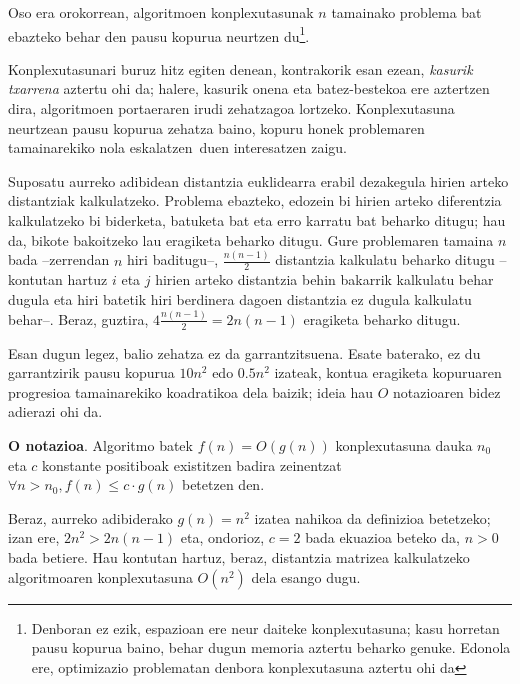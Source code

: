 \documentclass[eu]{ifirak}\usepackage[]{graphicx}\usepackage[]{color}
\newcommand{\zkk}{\guillemotleft}
\newcommand{\skk}{\guillemotright}
\begin{document}
Oso era orokorrean, algoritmoen konplexutasunak $n$ tamainako problema bat ebazteko behar den pausu kopurua neurtzen du\footnote{Denboran ez ezik, espazioan ere neur daiteke konplexutasuna; kasu horretan pausu kopurua baino, behar dugun memoria aztertu beharko genuke. Edonola ere, optimizazio problematan denbora konplexutasuna aztertu ohi da}. 

Konplexutasunari buruz hitz egiten denean, kontrakorik esan ezean, \textit{kasurik txarrena} aztertu ohi da; halere, kasurik onena eta batez-bestekoa ere aztertzen dira, algoritmoen portaeraren irudi zehatzagoa lortzeko. Konplexutasuna neurtzean pausu kopurua zehatza baino, kopuru honek problemaren tamainarekiko nola \zkk eskalatzen\skk\ duen interesatzen zaigu.

\begin{tcolorbox}
\begin{ifexample}
Suposatu aurreko adibidean distantzia euklidearra erabil dezakegula hirien arteko distantziak kalkulatzeko. Problema ebazteko, edozein bi hirien arteko diferentzia kalkulatzeko bi biderketa, batuketa bat eta erro karratu bat beharko ditugu; hau da, bikote bakoitzeko lau eragiketa beharko ditugu. Gure problemaren tamaina $n$ bada --zerrendan $n$ hiri baditugu--, $\frac{n(n-1)}{2}$ distantzia kalkulatu beharko ditugu --kontutan hartuz $i$ eta $j$ hirien arteko distantzia behin bakarrik kalkulatu behar dugula eta hiri batetik hiri berdinera dagoen distantzia ez dugula kalkulatu behar--. Beraz, guztira, $4\frac{n(n-1)}{2} = 2n(n-1)$ eragiketa beharko ditugu.
\end{ifexample}
\end{tcolorbox}

Esan dugun legez, balio zehatza ez da garrantzitsuena. Esate baterako, ez du garrantzirik pausu kopurua $10n^2$ edo $0.5n^2$ izateak, kontua eragiketa kopuruaren progresioa tamainarekiko koadratikoa dela baizik; ideia hau $O$ notazioaren bidez adierazi ohi da.

\begin{ifdefinition}
{\bf O notazioa}. Algoritmo batek $f(n)=O(g(n))$ konplexutasuna dauka $n_0$ eta $c$ konstante positiboak existitzen badira zeinentzat $\forall n>n_0, f(n)\leq c\cdot g(n)$ betetzen den.
\end{ifdefinition}

Beraz, aurreko adibiderako $g(n)=n^2$ izatea nahikoa da definizioa betetzeko; izan ere, $2n^2>2n(n-1)$ eta, ondorioz, $c=2$ bada ekuazioa beteko da, $n>0$ bada betiere. Hau kontutan hartuz, beraz, distantzia matrizea kalkulatzeko algoritmoaren konplexutasuna $O(n^2)$ dela esango dugu. 
\end{document}
